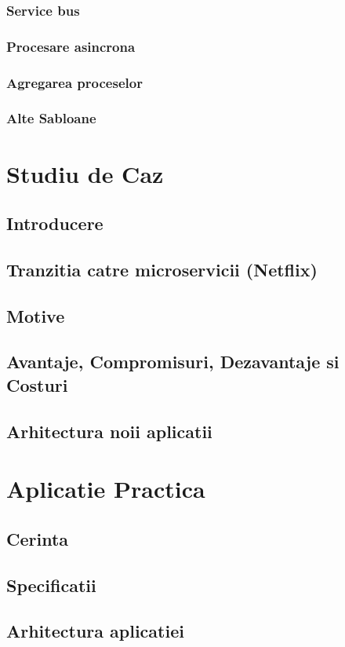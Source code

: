 \documentclass[12pt]{report}
\begin{document}
		\subsection{Service bus}
		\subsection{Procesare asincrona}
		\subsection{Agregarea proceselor}
		\subsection{Alte Sabloane}
\chapter{Studiu de Caz}
	\section{Introducere}
	\section{Tranzitia catre microservicii (Netflix)}
	\section{Motive}
	\section{Avantaje, Compromisuri, Dezavantaje si Costuri}
	\section{Arhitectura noii aplicatii}
	
\chapter{Aplicatie Practica}
	\section{Cerinta}
	\section{Specificatii}
	\section{Arhitectura aplicatiei}
\end{document}
